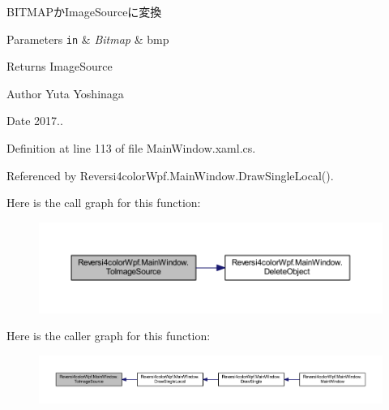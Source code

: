 B\+I\+T\+M\+A\+Pか\+Image\+Sourceに変換 


\begin{DoxyParams}[1]{Parameters}
\mbox{\tt in}  & {\em Bitmap} & bmp \\
\hline
\end{DoxyParams}
\begin{DoxyReturn}{Returns}
Image\+Source 
\end{DoxyReturn}
\begin{DoxyAuthor}{Author}
Yuta Yoshinaga 
\end{DoxyAuthor}
\begin{DoxyDate}{Date}
2017.. 
\end{DoxyDate}


Definition at line 113 of file Main\+Window.\+xaml.\+cs.



Referenced by Reversi4color\+Wpf.\+Main\+Window.\+Draw\+Single\+Local().

Here is the call graph for this function\+:
\nopagebreak
\begin{figure}[H]
\begin{center}
\leavevmode
\includegraphics[width=350pt]{class_reversi4color_wpf_1_1_main_window_a843b47fa1b0cf377435e262e32459705_cgraph}
\end{center}
\end{figure}
Here is the caller graph for this function\+:
\nopagebreak
\begin{figure}[H]
\begin{center}
\leavevmode
\includegraphics[width=350pt]{class_reversi4color_wpf_1_1_main_window_a843b47fa1b0cf377435e262e32459705_icgraph}
\end{center}
\end{figure}
\mbox{\label{class_reversi4color_wpf_1_1_main_window_a831a8cf1b728a5a24904633e707068bd}} 

